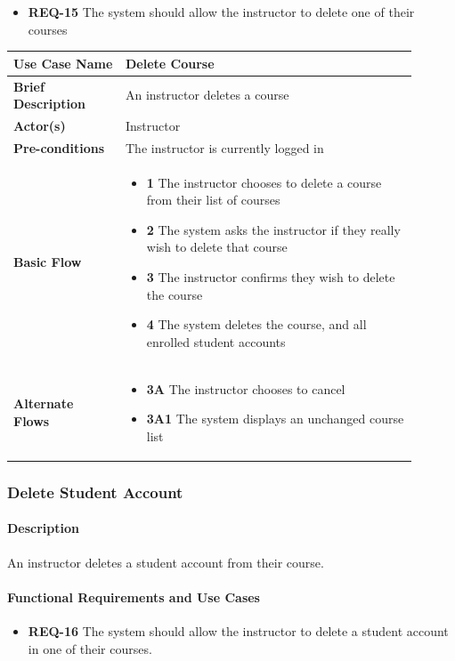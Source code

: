 \documentclass{article}
\begin{document}
\begin{itemize}
  \item \textbf{REQ-15} The system should allow the instructor to delete one of their courses
\end{itemize}

\begin{tabular}{| p{0.25\linewidth} | p{0.65\linewidth} |}
  \hline
  \textbf{Use Case Name} & Delete Course\\
  \hline
  \textbf{Brief Description} & An instructor deletes a course\\
  \hline
  \textbf{Actor(s)} & Instructor \\
  \hline
  \textbf{Pre-conditions} & The instructor is currently logged in\\
  \hline
  \textbf{Basic Flow} & \begin{itemize}
    \item[] \textbf{1} The instructor chooses to delete a course from their list of courses
    \item[] \textbf{2} The system asks the instructor if they really wish to delete that course
    \item[] \textbf{3} The instructor confirms they wish to delete the course
    \item[] \textbf{4} The system deletes the course, and all enrolled student accounts
  \end{itemize}\\
  \hline
  \textbf{Alternate Flows} & \begin{itemize}
    \item[] \textbf{3A} The instructor chooses to cancel
    \item[] \textbf{3A1} The system displays an unchanged course list
  \end{itemize}\\
  \hline
\end{tabular}

\subsubsection{Delete Student Account}

\paragraph{Description} An instructor deletes a student account from their course.

\paragraph{Functional Requirements and Use Cases}
\begin{itemize}
  \item \textbf{REQ-16} The system should allow the instructor to delete a student account in one of their courses.
\end{itemize}
\end{document}
